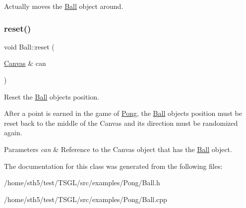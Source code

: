 Actually moves the \hyperlink{class_ball}{Ball} object around. \mbox{\label{class_ball_a12dad22dfdba8e2b92ae74464001d55f}} 
\subsubsection{\texorpdfstring{reset()}{reset()}}
{\footnotesize\ttfamily void Ball\+::reset (\begin{DoxyParamCaption}\item[{\hyperlink{classtsgl_1_1_canvas}{Canvas} \&}]{can }\end{DoxyParamCaption})}



Reset the \hyperlink{class_ball}{Ball} object\textquotesingle{}s position. 

After a point is earned in the game of \hyperlink{class_pong}{Pong}, the \hyperlink{class_ball}{Ball} object\textquotesingle{}s position must be reset back to the middle of the Canvas and its direction must be randomized again. 
\begin{DoxyParams}{Parameters}
{\em can} & Reference to the Canvas object that has the \hyperlink{class_ball}{Ball} object. \\
\hline
\end{DoxyParams}


The documentation for this class was generated from the following files\+:\begin{DoxyCompactItemize}
\item 
/home/sth5/test/\+T\+S\+G\+L/src/examples/\+Pong/Ball.\+h\item 
/home/sth5/test/\+T\+S\+G\+L/src/examples/\+Pong/Ball.\+cpp\end{DoxyCompactItemize}
